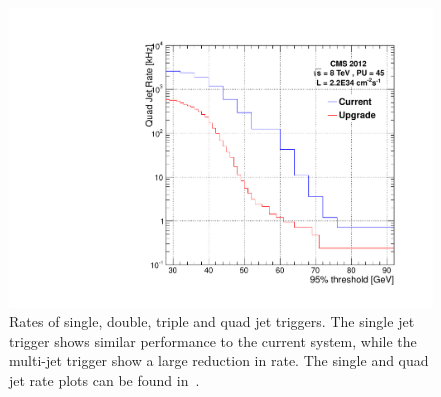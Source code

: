 \begin{figure}[t!]
\begin{center}
  \includegraphics[scale=0.3]{Figures/l1jets/quadJetRates_95thresh_2e34.pdf}
\caption{Rates of single, double, triple and quad jet triggers. The single jet trigger shows similar performance to the current system, while the multi-jet trigger show a large reduction in rate. The single and quad jet rate plots can be found in~\cite{Tapper:1556311}.}
\label{JetRate_95}
\end{center}
\end{figure}


